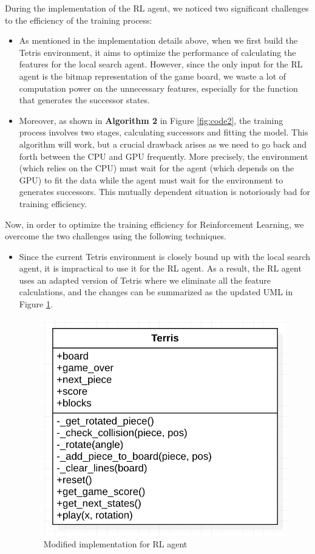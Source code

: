 \documentclass[letterpaper]{article} %
\begin{document}
\begin{itemize}
During the implementation of the RL agent, we noticed two significant challenges to the efficiency of the training process:
\begin{itemize}
  \item 
  As mentioned in the implementation details above, when we first build the Tetris environment, it aims to optimize the performance of calculating the features for the local search agent. However, since the only input for the RL agent is the bitmap representation of the game board, we waste a lot of computation power on the unnecessary features, especially for the function that generates the successor states.
  \item 
  Moreover, as shown in {\bf Algorithm 2} in Figure \ref{fig:code2}, the training process involves two stages, calculating successors and fitting the model. This algorithm will work, but a crucial drawback arises as we need to go back and forth between the CPU and GPU frequently. More precisely, the environment (which relies on the CPU) must wait for the agent (which depends on the GPU) to fit the data while the agent must wait for the environment to generates successors. This mutually dependent situation is notoriously bad for training efficiency.
\end{itemize}
Now, in order to optimize the training efficiency for Reinforcement Learning, we overcome the two challenges using the following techniques.
\begin{itemize}
  \item 
  Since the current Tetris environment is closely bound up with the local search agent, it is impractical to use it for the RL agent. As a result, the RL agent uses an adapted version of Tetris where we eliminate all the feature calculations, and the changes can be summarized as the updated UML in Figure \ref{fig:modified_uml}.

 \begin{figure}[h!]
    \centering
    \includegraphics[width=0.9\linewidth]{figures/modifiedUML.png}
    \caption{Modified implementation for RL agent}
    \label{fig:modified_uml}
  \end{figure}
  

\end{itemize}
\end{itemize}
\end{document}
